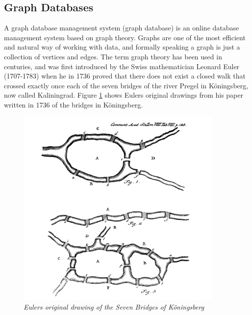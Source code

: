 \subsection{Graph Databases}
A graph database management system (graph database) \citep{robinson13} is an online database management system %
based on graph theory. Graphs are one of the most efficient and natural way of working with data, and formally speaking a graph is just a collection of vertices and edges. The term graph theory has been used in centuries, and was first introduced by the Swiss mathematician Leonard Euler (1707-1783) when he in 1736 proved that there does not exist a closed walk that crossed exactly once each of the seven bridges of the river Pregel in Köningsberg, now called Kaliningrad\citep{alexanderson06}. Figure \ref{fig:7bridgesEuler} shows Eulers original drawings from his paper written in 1736 \citep{euler1741} of the bridges in Köningsberg. 

\begin{figure}[H]
  \centering
  \includegraphics[width=4in]{assets/7bridges-euler.png}
  \caption{\textit{Eulers original drawing of the Seven Bridges of Köningsberg}} 
  \label{fig:7bridgesEuler}
\end{figure}

